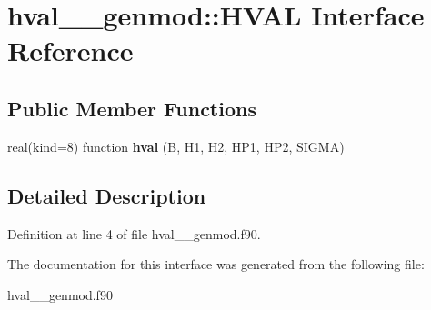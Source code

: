 \hypertarget{interfacehval____genmod_1_1_h_v_a_l}{\section{hval\+\_\+\+\_\+genmod\+:\+:H\+V\+A\+L Interface Reference}
\label{interfacehval____genmod_1_1_h_v_a_l}
}
\subsection*{Public Member Functions}
\begin{DoxyCompactItemize}
\item 
\hypertarget{interfacehval____genmod_1_1_h_v_a_l_acc864dfe04eaa127a5a8a9b23419fe6b}{real(kind=8) function {\bfseries hval} (B, H1, H2, H\+P1, H\+P2, S\+I\+G\+M\+A)}\label{interfacehval____genmod_1_1_h_v_a_l_acc864dfe04eaa127a5a8a9b23419fe6b}

\end{DoxyCompactItemize}


\subsection{Detailed Description}


Definition at line 4 of file hval\+\_\+\+\_\+genmod.\+f90.



The documentation for this interface was generated from the following file\+:\begin{DoxyCompactItemize}
\item 
hval\+\_\+\+\_\+genmod.\+f90\end{DoxyCompactItemize}
